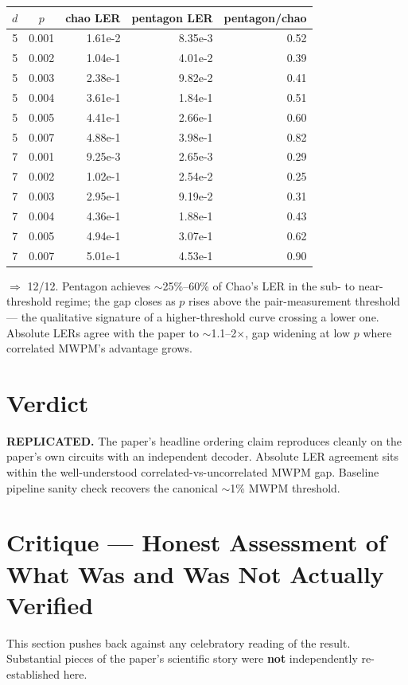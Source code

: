 \documentclass[11pt]{article}
\begin{document}
\begin{tabular}{ccrrr}
\toprule
$d$ & $p$ & chao LER & pentagon LER & pentagon/chao \\
\midrule
5 & 0.001 & 1.61e-2 & 8.35e-3 & 0.52 \\
5 & 0.002 & 1.04e-1 & 4.01e-2 & 0.39 \\
5 & 0.003 & 2.38e-1 & 9.82e-2 & 0.41 \\
5 & 0.004 & 3.61e-1 & 1.84e-1 & 0.51 \\
5 & 0.005 & 4.41e-1 & 2.66e-1 & 0.60 \\
5 & 0.007 & 4.88e-1 & 3.98e-1 & 0.82 \\
7 & 0.001 & 9.25e-3 & 2.65e-3 & 0.29 \\
7 & 0.002 & 1.02e-1 & 2.54e-2 & 0.25 \\
7 & 0.003 & 2.95e-1 & 9.19e-2 & 0.31 \\
7 & 0.004 & 4.36e-1 & 1.88e-1 & 0.43 \\
7 & 0.005 & 4.94e-1 & 3.07e-1 & 0.62 \\
7 & 0.007 & 5.01e-1 & 4.53e-1 & 0.90 \\
\bottomrule
\end{tabular}

$\Rightarrow$ 12/12. Pentagon achieves $\sim$25\%--60\% of Chao's LER in the
sub- to near-threshold regime; the gap closes as $p$ rises above the
pair-measurement threshold --- the qualitative signature of a higher-threshold
curve crossing a lower one. Absolute LERs agree with the paper to
$\sim$1.1--2$\times$, gap widening at low $p$ where correlated MWPM's advantage
grows.

\section{Verdict}
\textbf{REPLICATED.} The paper's headline ordering claim reproduces cleanly on
the paper's own circuits with an independent decoder. Absolute LER agreement
sits within the well-understood correlated-vs-uncorrelated MWPM gap. Baseline
pipeline sanity check recovers the canonical $\sim$1\% MWPM threshold.

\section{Critique --- Honest Assessment of What Was and Was Not Actually
Verified}

This section pushes back against any celebratory reading of the result.
Substantial pieces of the paper's scientific story were \textbf{not}
independently re-established here.
\end{document}
